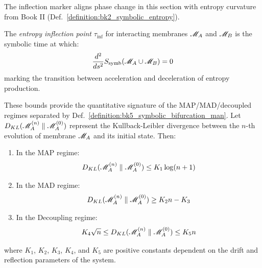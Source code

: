 \begin{definition} \label{definition:bk5_entropy_inflection_point} 
The inflection marker aligns phase change in this section with entropy curvature from Book II (Def.~\ref{definition:bk2_symbolic_entropy}).

The \emph{entropy inflection point} $\tau_{\text{inf}}$ for interacting membranes $\mathscr{M}_A$ and $\mathscr{M}_B$ is the symbolic time at which:
\begin{equation}
\frac{d^2}{ds^2}S_{\text{symb}}(\mathscr{M}_A \cup \mathscr{M}_B) = 0
\end{equation}
\noindent marking the transition between acceleration and deceleration of entropy production.
\end{definition}
\begin{lemma} \label{lemma:bk5_symbolic_divergence_bounds} 
These bounds provide the quantitative signature of the MAP/MAD/decoupled regimes separated by Def.~\ref{definition:bk5_symbolic_bifurcation_man}.
Let $D_{KL}(\mathscr{M}_A^{(n)} \parallel \mathscr{M}_A^{(0)})$ represent the Kullback-Leibler divergence between the $n$-th evolution of membrane $\mathscr{M}_A$ and its initial state. Then:
\begin{enumerate}
  \item[(i)] In the MAP regime:
  \begin{equation}
  D_{KL}(\mathscr{M}_A^{(n)} \parallel \mathscr{M}_A^{(0)}) \leq K_1 \log(n + 1)
  \end{equation}
  \item[(ii)] In the MAD regime:
  \begin{equation}
  D_{KL}(\mathscr{M}_A^{(n)} \parallel \mathscr{M}_A^{(0)}) \geq K_2 n - K_3
  \end{equation}
  \item[(iii)] In the Decoupling regime:
  \begin{equation}
  K_4 \sqrt{n} \leq D_{KL}(\mathscr{M}_A^{(n)} \parallel \mathscr{M}_A^{(0)}) \leq K_5 n
  \end{equation}
\end{enumerate}
\noindent where $K_1$, $K_2$, $K_3$, $K_4$, and $K_5$ are positive constants dependent on the drift and reflection parameters of the system.
\end{lemma}
